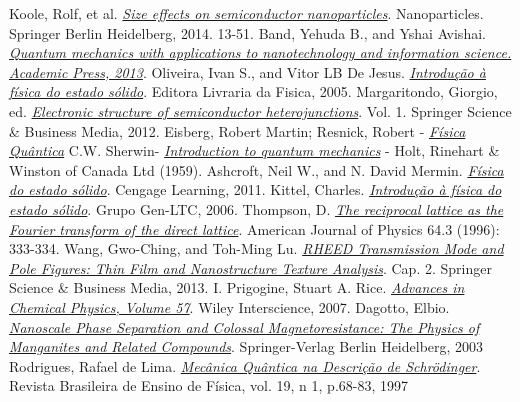  Koole, Rolf, et al. \href{https://link.springer.com/chapter/10.1007/978-3-662-44823-6_2}{\it Size effects on semiconductor nanoparticles}. Nanoparticles. Springer Berlin Heidelberg, 2014. 13-51.
 Band, Yehuda B., and Yshai Avishai. \href{https://www.elsevier.com/books/quantum-mechanics-with-applications-to-nanotechnology-and-information-science/band/978-0-444-53786-7}{\it Quantum mechanics with applications to nanotechnology and information science. Academic Press, 2013}.
 Oliveira, Ivan S., and Vitor LB De Jesus. \href{http://www.saraiva.com.br/introducao-a-fisica-do-estado-solido-2-ed-3527998.html}{\it Introdução à física do estado sólido}. Editora Livraria da Fisica, 2005.
 Margaritondo, Giorgio, ed. \href{http://www.springer.com/br/book/9789027728234}{\it Electronic structure of semiconductor heterojunctions}. Vol. 1. Springer Science \& Business Media, 2012.
 Eisberg, Robert Martin; Resnick, Robert - \href{https://www.livrariadafisica.com.br/detalhe_produto.aspx?id=6237}{\it Física Quântica}
 C.W. Sherwin- \href{https://www.amazon.com/Introduction-Quantum-Mechanics-C-W-Sherwin/dp/0030068851}{\it Introduction to quantum mechanics} - Holt, Rinehart \& Winston of Canada Ltd (1959). 
 Ashcroft, Neil W., and N. David Mermin. \href{https://www.livrariadafisica.com.br/detalhe_produto.aspx?id=101883}{\it Física do estado sólido}. Cengage Learning, 2011.
 Kittel, Charles. \href{https://www.amazon.com.br/dp/8521615051/ref=asc_df_85216150515016109?smid=A1ZZFT5FULY4LN&tag=goog0ef-20&linkCode=asn&creative=380341&creativeASIN=8521615051}{\it Introdução à física do estado sólido}. Grupo Gen-LTC, 2006.
 Thompson, D. \href{http://aapt.scitation.org/doi/abs/10.1119/1.18243}{\it The reciprocal lattice as the Fourier transform of the direct lattice}. American Journal of Physics 64.3 (1996): 333-334.
 Wang, Gwo-Ching, and Toh-Ming Lu. \href{https://books.google.com.br/books?hl=pt-BR&lr=&id=LEC9BAAAQBAJ&oi=fnd&pg=PR6&dq=ISBN:+978-1-4614-9286-3&ots=6N688QVTZa&sig=eKxt-la7NjrX5ZWrmHEoIZpaTwQ#v=onepage&q=ISBN%3A%20978-1-4614-9286-3&f=false}{\it RHEED Transmission Mode and Pole Figures: Thin Film and Nanostructure Texture Analysis}. Cap. 2. Springer Science \& Business Media, 2013.
 I. Prigogine, Stuart A. Rice. \href{http://onlinelibrary.wiley.com/book/10.1002/9780470142813}{\it Advances in Chemical Physics, Volume 57}. Wiley Interscience, 2007.
 Dagotto, Elbio. \href{http://www.springer.com/la/book/9783540432456} {\it Nanoscale Phase Separation and Colossal Magnetoresistance: The Physics of Manganites and Related Compounds}. Springer-Verlag Berlin Heidelberg, 2003 
 Rodrigues, Rafael de Lima. \href{http://sbfisica.org.br/rbef/pdf/v19_68.pdf}{\it Mecânica Quântica na Descrição de Schrödinger}. Revista Brasileira de Ensino de Física, vol. 19, n 1, p.68-83, 1997

